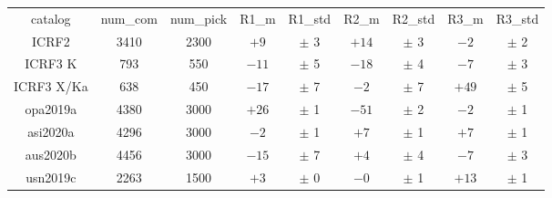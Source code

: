 \begin{table}
\begin{tabular}{ccccccccc}
catalog & num_com & num_pick & R1_m & R1_std & R2_m & R2_std & R3_m & R3_std \\
ICRF2 & 3410 & 2300 & $  +9$ & $\pm$  3 & $ +14$ & $\pm$  3 & $  -2$ & $\pm$  2 \\
ICRF3 K & 793 & 550 & $ -11$ & $\pm$  5 & $ -18$ & $\pm$  4 & $  -7$ & $\pm$  3 \\
ICRF3 X/Ka & 638 & 450 & $ -17$ & $\pm$  7 & $  -2$ & $\pm$  7 & $ +49$ & $\pm$  5 \\
opa2019a & 4380 & 3000 & $ +26$ & $\pm$  1 & $ -51$ & $\pm$  2 & $  -2$ & $\pm$  1 \\
asi2020a & 4296 & 3000 & $  -2$ & $\pm$  1 & $  +7$ & $\pm$  1 & $  +7$ & $\pm$  1 \\
aus2020b & 4456 & 3000 & $ -15$ & $\pm$  7 & $  +4$ & $\pm$  4 & $  -7$ & $\pm$  3 \\
usn2019c & 2263 & 1500 & $  +3$ & $\pm$  0 & $  -0$ & $\pm$  1 & $ +13$ & $\pm$  1 \\
\end{tabular}
\end{table}
